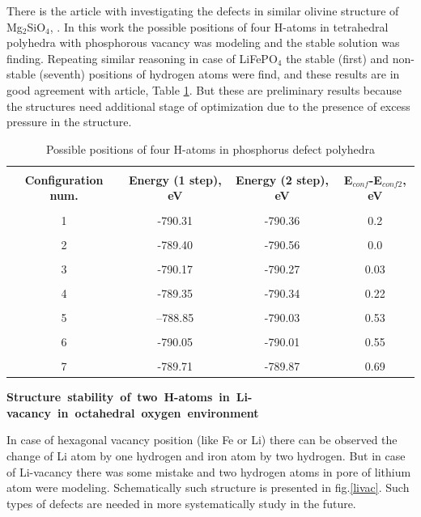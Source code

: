 \documentclass[11pt]{article}
\begin{document}
There is the article with investigating the defects in similar olivine structure of Mg$_2$SiO$_4$, \cite{mineral}. In this work the possible positions of four H-atoms in tetrahedral polyhedra with phosphorous vacancy was modeling and the stable solution was finding. Repeating similar reasoning in case of LiFePO$_4$ the stable (first) and non-stable (seventh) positions of hydrogen atoms were find, and these results are in good agreement with article,  Table \ref{4H}. But these are preliminary results because the structures need additional stage of optimization due to the presence of excess pressure in the structure. 

\begin{table}[H]
\scriptsize{
\caption{Possible positions of four H-atoms in phosphorus defect polyhedra}
\label{4H}
\begin{center}
\begin{tabular}{|c|c|c|c|}
\hline
& & & \\
 \textbf{Configuration num.} & \textbf{Energy (1 step), eV} &  \textbf{Energy (2 step), eV} &  \textbf{E$_{conf}$-E$_{conf2}$, eV}\\ 
\hline
&  & & \\
1  & -790.31 & -790.36 & 0.2\\ 
\hline
&  & &\\
2  & -789.40 & -790.56 & 0.0\\
\hline
&  & &\\
3 & -790.17 & -790.27 & 0.03\\
\hline
&  & &\\
4 & -789.35 & -790.34 & 0.22\\
\hline
&  & &\\
5 & --788.85 & -790.03 & 0.53\\
\hline
&  & &\\
6 & -790.05 & -790.01 & 0.55\\
\hline
&  & &\\
7 & -789.71 & -789.87 & 0.69\\
\hline
\end{tabular}
\end{center}
}
\end{table}

\noindent\mbox{\textbf{Structure stability of two H-atoms in Li-vacancy in octahedral oxygen environment}}

In case of hexagonal vacancy position (like Fe or Li) there can be observed the change of Li atom by one hydrogen and iron atom by two hydrogen. But in case of Li-vacancy there was some mistake and two hydrogen atoms in pore of lithium atom were modeling. Schematically such structure is presented in fig.\ref{livac}. Such types of defects are needed in more systematically study in the future.
\end{document}
